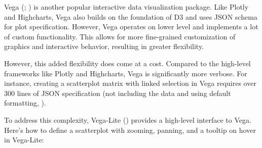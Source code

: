 \documentclass[
  openany]{book}
\newenvironment{Shaded}{\begin{snugshade}}{\end{snugshade}}
\newcommand{\AttributeTok}[1]{\textcolor[rgb]{0.13,0.29,0.53}{#1}}
\newcommand{\ConstantTok}[1]{\textcolor[rgb]{0.56,0.35,0.01}{#1}}
\newcommand{\DecValTok}[1]{\textcolor[rgb]{0.00,0.00,0.81}{#1}}
\newcommand{\FunctionTok}[1]{\textcolor[rgb]{0.13,0.29,0.53}{\textbf{#1}}}
\newcommand{\NormalTok}[1]{#1}
\newcommand{\OtherTok}[1]{\textcolor[rgb]{0.56,0.35,0.01}{#1}}
\newcommand{\SpecialCharTok}[1]{\textcolor[rgb]{0.81,0.36,0.00}{\textbf{#1}}}
\newcommand{\StringTok}[1]{\textcolor[rgb]{0.31,0.60,0.02}{#1}}
\theoremstyle{definition}
\theoremstyle{definition}
\theoremstyle{definition}
\theoremstyle{definition}
\theoremstyle{remark}
\begin{document}
Vega (; ) is another popular interactive data visualization package. Like Plotly and Highcharts, Vega also builds on the foundation of D3 and uses JSON schema for plot specification. However, Vega operates on lower level and implements a lot of custom functionality. This allows for more fine-grained customization of graphics and interactive behavior, resulting in greater flexibility.

However, this added flexibility does come at a cost. Compared to the high-level frameworks like Plotly and Highcharts, Vega is significantly more verbose. For instance, creating a scatterplot matrix with linked selection in Vega requires over 300 lines of JSON specification (not including the data and using default formatting, ).

To address this complexity, Vega-Lite () provides a high-level interface to Vega. Here's how to define a scatterplot with zooming, panning, and a tooltip on hover in Vega-Lite:

\begin{Shaded}
\end{Shaded}
\end{document}
